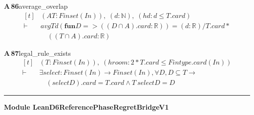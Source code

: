 \documentclass[conference]{IEEEtran}
\theoremstyle{definition}
\newcommand{\lean}[1]{\textsf{\footnotesize #1}}
\begin{document}
\noindent\textbf{A\,86}\quad\lean{average\_overlap}
{\footnotesize\[ \begin{aligned}[t]
&(\mathit{A} \mathit{T} : \mathit{Finset} (\mathit{I} \mathit{n})),\; (\mathit{d} : \mathbb{N} ),\; (\mathit{hd} : \mathit{d} \leq \mathit{T}.\mathit{card})\\
\vdash\;&\mathit{avg} \mathit{T} \mathit{d} (\mathbf{fun} \mathit{D} => ((\mathit{D} \cap \mathit{A}).\mathit{card}:\mathbb{R} )) = (\mathit{d}:\mathbb{R} )/\mathit{T}.\mathit{card}*\\
&\quad ((\mathit{T} \cap \mathit{A}).\mathit{card}:\mathbb{R} )
\end{aligned} \]}

\noindent\textbf{A\,87}\quad\lean{legal\_rule\_exists}
{\footnotesize\[ \begin{aligned}[t]
&(\mathit{T} : \mathit{Finset} (\mathit{I} \mathit{n})),\; (\mathit{hroom} : 2*\mathit{T}.\mathit{card} \leq \mathit{Fintype}.\mathit{card} (\mathit{I} \mathit{n}))\\
\vdash\;&\exists \mathit{select} : \mathit{Finset} (\mathit{I} \mathit{n}) \to \mathit{Finset} (\mathit{I} \mathit{n}), \forall \mathit{D},\mathit{D} \subseteq \mathit{T} \to\\
&\quad (\mathit{select} \mathit{D}).\mathit{card}=\mathit{T}.\mathit{card} \wedge \mathit{T} \ \mathit{select} \mathit{D}=\mathit{D}
\end{aligned} \]}

\vspace{4pt}\noindent\rule{\columnwidth}{0.4pt}\par\vspace{2pt}
\noindent\textbf{Module \lean{LeanD6ReferencePhaseRegretBridgeV1}}\par\vspace{3pt}
\end{document}
